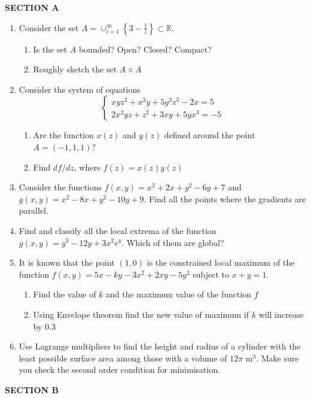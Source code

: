 \documentclass[12pt,a4paper]{article}
\begin{document}
\vspace{10pt}

\textbf{SECTION A}


\begin{enumerate}
\item Consider the set $A=\cup_{i=1}^{\infty} \left\{ 3-\frac{1}{i} \right\} \subset \mathbb{R}$.
\begin{enumerate}
\item Is the set $A$ bounded? Open? Closed? Compact?
\item Roughly sketch the set $A \times A$
\end{enumerate}

\item Consider the system of equations 
\[
\begin{cases}
xyz^2+x^3y+5y^3z^3-2x=5 \\
2x^2yz+z^2+3xy+5yx^3=-5
\end{cases}
\]
\begin{enumerate}
\item Are the function $x(z)$ and $y(z)$ defined around the point $A=(-1,1,1)$?
\item Find $df/dz$, where $f(z)=x(z)y(z)$
\end{enumerate}
\item Consider the functions $f(x,y)=x^2+2x+y^2-6y+7$ and $g(x,y)=x^2-8x+y^2-10y+9$. Find all the points where the gradients are parallel.
\item Find and classify all the local extrema of the function $g(x,y)=y^3 -12y+3x^2e^y$. Which of them are global?
\item It is known that the point $(1,0)$ is the constrained local maximum of the function $f(x,y)=5x-ky-3x^2+2xy-5y^2$ subject to $x+y=1$.
\begin{enumerate}
\item Find the value of $k$ and the maximum value of the function $f$
\item Using Envelope theorem find the new value of maximum if $k$ will increase by $0.3$
\end{enumerate}
\item Use Lagrange multipliers to find the height and radius of a cylinder with the least possible
surface area among those with a volume of $12\pi$ m$^3$. Make sure you check the second order
condition for minimisation.
\end{enumerate}

\textbf{SECTION B}
\end{document}
